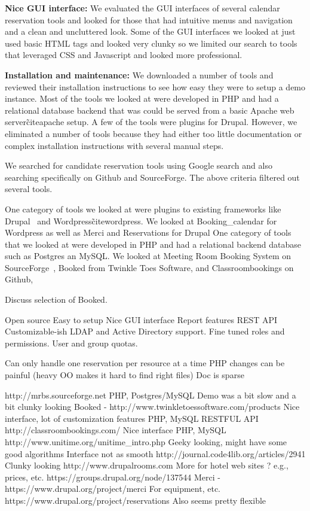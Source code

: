 \documentclass{acm_proc_article-sp}
\begin{document}
\textbf{Nice GUI interface:}  We evaluated the GUI interfaces of several calendar reservation tools and looked for those that had intuitive menus and navigation and  a clean and uncluttered look.  Some of the GUI interfaces we looked at just used basic HTML tags and looked very clunky so we limited our search to tools that leveraged CSS and Javascript and looked more professional.   

\textbf{Installation and maintenance:}  We downloaded a number of tools and reviewed their installation instructions to see how easy they were to setup a demo instance.  Most of the tools we looked at were developed in PHP and had a relational database backend that was could be served from a basic  Apache web server\~cite{apache} setup.   A few of the tools were plugins for Drupal.  However, we eliminated a number of tools because they had either too little documentation or complex installation instructions with several manual steps.   

We searched for candidate reservation tools using Google search and also searching specifically on Github and SourceForge.  The above criteria filtered out several tools.  

One category of tools we looked at were plugins to existing frameworks like Drupal~\cite{drupal} and Wordpress\~cite{wordpress}.  We looked at Booking\_calendar for Wordpress as well as Merci and Reservations for Drupal   
One category of tools that we looked at were developed in PHP and had a relational backend database such as Postgres an MySQL.  We looked at Meeting Room Booking System on SourceForge~\cite{mrbs}, Booked from Twinkle Toes Software, and Classroombookings on Github, 



Discuss selection of Booked.

Open source
Easy to setup
Nice GUI interface
Report features
REST API
Customizable-ish
LDAP and Active Directory support.
Fine tuned roles and permissions.
User and group quotas.

Can only handle one reservation per resource at a time
PHP changes can be painful (heavy OO makes it hard to find right files)
Doc is sparse

http://mrbs.sourceforge.net
	PHP, Postgres/MySQL
	Demo was a bit slow and a bit clunky looking
Booked - http://www.twinkletoessoftware.com/products
	Nice interface, lot of customization features
	PHP, MySQL
	RESTFUL API
http://classroombookings.com/
	Nice interface
	PHP, MySQL
http://www.unitime.org/unitime\_intro.php
	Geeky looking, might have some good algorithms
	Interface not as smooth
	http://journal.code4lib.org/articles/2941
	Clunky looking
http://www.drupalrooms.com
	More for hotel web sites ? e.g., prices, etc.
https://groups.drupal.org/node/137544
	Merci - https://www.drupal.org/project/merci
		For equipment, etc.
	https://www.drupal.org/project/reservations
		Also seems pretty flexible
		
\end{document}
